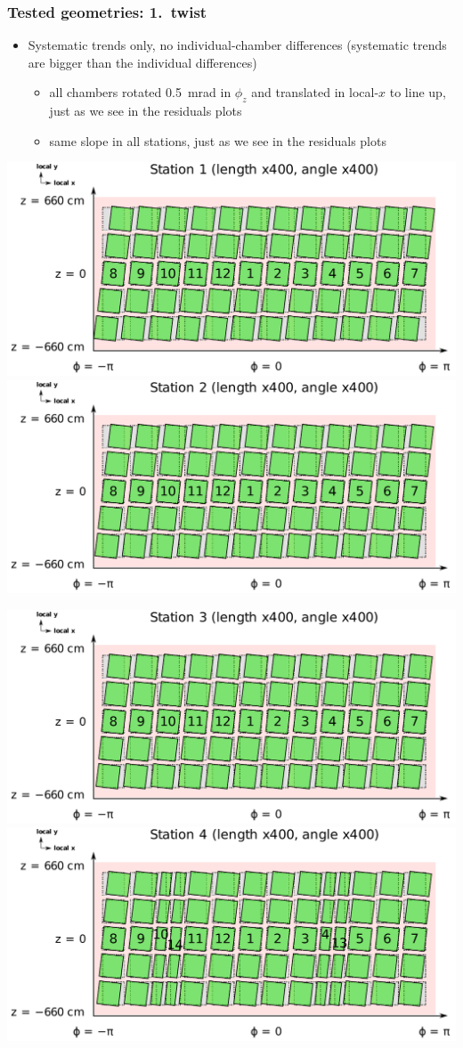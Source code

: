 \documentclass[compress]{beamer}
\begin{document}
\begin{frame}
\frametitle{Tested geometries: 1.\ twist}
\begin{itemize}
\item Systematic trends only, no individual-chamber differences (systematic trends are bigger than the individual differences)
\begin{itemize}
\item all chambers rotated 0.5~mrad in $\phi_z$ and translated in local-$x$ to line up, just as we see in the residuals plots
\item same slope in all stations, just as we see in the residuals plots
\end{itemize}
\end{itemize}

\includegraphics[width=0.49\linewidth]{twist_station1.pdf}
\includegraphics[width=0.49\linewidth]{twist_station2.pdf}

\includegraphics[width=0.49\linewidth]{twist_station3.pdf}
\includegraphics[width=0.49\linewidth]{twist_station4.pdf}
\end{frame}
\end{document}
